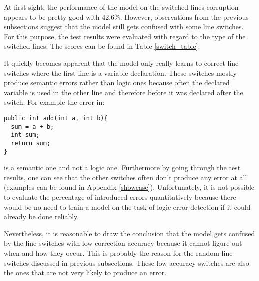 At first sight, the performance of the model on the switched lines corruption appears to be pretty good with 42.6\%. However, observations from the previous subsections suggest that the model still gets confused with some line switches. For this purpose, the test results were evaluated with regard to the type of the switched lines. The scores can be found in Table \ref{switch_table}.

It quickly becomes apparent that the model only really learns to correct line switches where the first line is a variable declaration. These switches mostly produce semantic errors rather than logic ones because often the declared variable is used in the other line and therefore before it was declared after the switch. For example the error in:

\begin{lstlisting}[style=inline]
public int add(int a, int b){
  sum = a + b;
  int sum;
  return sum;
}
\end{lstlisting}

\noindent is a semantic one and not a logic one. Furthermore by going through the test results, one can see that the other switches often don't produce any error at all (examples can be found in Appendix \ref{showcase}). Unfortunately, it is not possible to evaluate the percentage of introduced errors quantitatively because there would be no need to train a model on the task of logic error detection if it could already be done reliably.

Nevertheless, it is reasonable to draw the conclusion that the model gets confused by the line switches with low correction accuracy because it cannot figure out when and how they occur. This is probably the reason for the random line switches discussed in previous subsections. These low accuracy switches are also the ones that are not very likely to produce an error.
